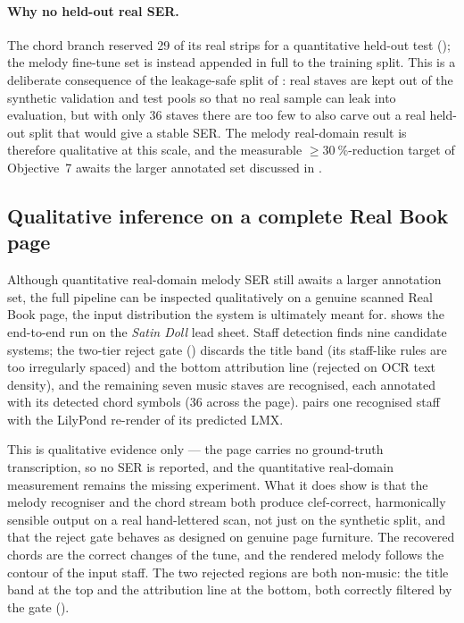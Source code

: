 \paragraph{Why no held-out real SER.}
The chord branch reserved \num{29} of its real strips for a quantitative
held-out test (); the melody fine-tune set is
instead appended in full to the training split.  This is a deliberate
consequence of the leakage-safe split of :
real staves are kept out of the synthetic validation and test pools so
that no real sample can leak into evaluation, but with only \num{36}
staves there are too few to also carve out a real held-out split that
would give a stable SER.  The melody real-domain result is therefore
qualitative at this scale, and the measurable
$\geq\SI{30}{\percent}$-reduction target of Objective~7 awaits the larger
annotated set discussed in .

\subsection{Qualitative inference on a complete Real Book page}
\label{sec:res-realpage}

Although quantitative real-domain melody SER still awaits a larger
annotation set, the full pipeline can be inspected qualitatively on a
genuine scanned Real Book page, the input distribution the system is
ultimately meant for.
 shows the end-to-end run on the
\textit{Satin Doll} lead sheet.
Staff detection finds nine candidate systems; the two-tier reject gate
() discards the title band (its
staff-like rules are too irregularly spaced) and the bottom attribution
line (rejected on OCR text density), and the remaining seven music
staves are recognised, each annotated with its detected chord symbols
(\num{36} across the page).
 pairs one recognised staff with the
LilyPond re-render of its predicted LMX.

This is qualitative evidence only --- the page carries no ground-truth
transcription, so no SER is reported, and the quantitative real-domain
measurement remains the missing experiment.
What it does show is that the melody recogniser and the chord stream
both produce clef-correct, harmonically sensible output on a real
hand-lettered scan, not just on the synthetic split, and that the
reject gate behaves as designed on genuine page furniture.
The recovered chords are the correct changes of the tune, and the
rendered melody follows the contour of the input staff.
The two rejected regions are both non-music: the title band at the top
and the attribution line at the bottom, both correctly filtered by the
gate ().

